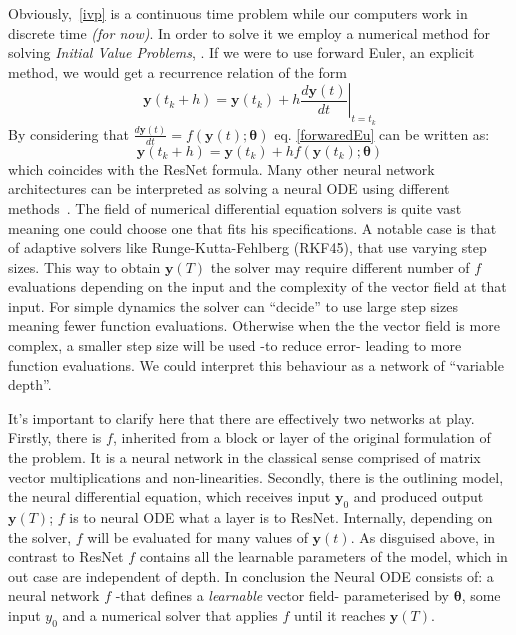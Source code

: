 \documentclass[11pt]{article}
\begin{document}
    Obviously,~\eqref{ivp} is a continuous time problem while our computers work in discrete time \textit{(for now)}.
    In order to solve it we employ a numerical method for solving \textit{Initial Value Problems}, .
    If we were to use forward Euler, an explicit method, we would get a recurrence relation of the form
    \begin{equation}
        \pmb{y}(t_k + h) = \pmb{y}(t_k) + h \left. \frac{d\pmb{y}(t)}{dt} \right|_{t = t_k}
        \label{forwaredEu}
    \end{equation}
    By considering that $\frac{d \pmb{y}(t)}{dt} = f(\pmb{y}(t);\pmb{\theta})$ eq. \eqref{forwaredEu} can be written as:
    \begin{equation}
        \pmb{y}(t_k + h) = \pmb{y}(t_k) + h f(\pmb{y}(t_k); \pmb{\theta} )
        \label{res2eul}
    \end{equation}
    which coincides with the ResNet formula.
    Many other neural network architectures can be interpreted as solving a neural ODE using different methods~\cite{chen2019ordinary}.
    The field of numerical differential equation solvers is quite vast meaning one could choose one that fits his specifications.
    A notable case is that of adaptive solvers like Runge-Kutta-Fehlberg (RKF45), that use varying step sizes.
    This way to obtain  $\pmb{y}(T)$ the solver may require different number of $f$ evaluations depending on the input and the complexity of the vector field at that input.
    For simple dynamics the solver can ``decide'' to use large step sizes meaning fewer function evaluations.
    Otherwise when the the vector field is more complex, a smaller step size will be used -to reduce error- leading to more function evaluations.
    We could interpret this behaviour as a network of ``variable depth''.

    It's important to clarify here that there are effectively two networks at play.
    Firstly, there is $f$, inherited from a block or layer of the original formulation of the problem.
    It is a neural network in the classical sense comprised of matrix vector multiplications and non-linearities.
    Secondly, there is the outlining model, the neural differential equation, which receives input $\pmb{y}_0$ and produced output $\pmb{y}(T)$; $f$ is to neural ODE what a layer is to ResNet.
    Internally, depending on the solver, $f$ will be evaluated for many values of $\pmb{y}(t)$.
    As disguised above, in contrast to ResNet $f$ contains all the learnable parameters of the model, which in out case are independent of depth.
    In conclusion the Neural ODE consists of: a neural network $f$ -that defines a \textit{learnable} vector field- parameterised by $\pmb{\theta}$,  some input $y_0$ and a numerical solver that applies $f$ until it reaches $\pmb{y}(T)$.
\end{document}
